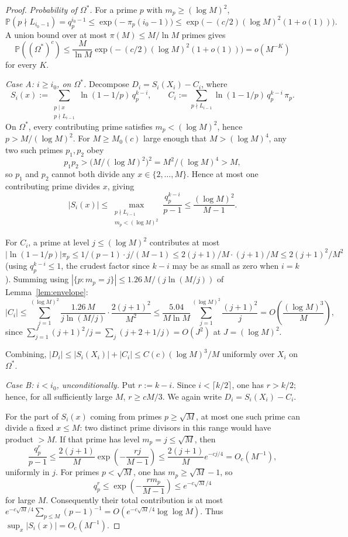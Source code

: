 \documentclass[11pt]{article}
\theoremstyle{remark}
\newcommand{\PP}{\mathbb{P}}
\begin{document}
\begin{proof}
\textit{Probability of $\Omega^*$.} For a prime $p$ with $m_p \geq (\log M)^2$,
\[
\PP(p \nmid L_{i_0-1}) = q_p^{i_0-1} \leq \exp\bigl(-\pi_p(i_0-1)\bigr) \leq \exp\bigl(-(c/2)(\log M)^2(1+o(1))\bigr).
\]
A union bound over at most $\pi(M) \leq M/\ln M$ primes gives
\[
\PP((\Omega^*)^c) \leq \frac{M}{\ln M}\exp\bigl(-(c/2)(\log M)^2(1+o(1))\bigr)=o(M^{-K})
\]
for every $K$.

\textit{Case A: $i \geq i_0$, on $\Omega^*$.}
Decompose $D_i = S_i(X_i) - C_i$, where
\[
S_i(x) := \sum_{\substack{p \mid x \\ p \nmid L_{i-1}}} \ln(1 - 1/p)\, q_p^{k-i}, \qquad C_i := \sum_{p \nmid L_{i-1}} \ln(1 - 1/p)\, q_p^{k-i}\, \pi_p.
\]
On $\Omega^*$, every contributing prime satisfies $m_p < (\log M)^2$, hence $p > M/(\log M)^2$. For $M \geq M_0(c)$ large enough that $M > (\log M)^4$, any two such primes $p_1, p_2$ obey
\[
p_1 p_2 > \bigl(M/(\log M)^2\bigr)^2 = M^2/(\log M)^4 > M,
\]
so $p_1$ and $p_2$ cannot both divide any $x \in \{2, \ldots, M\}$. Hence at most one contributing prime divides $x$, giving
\[
|S_i(x)| \leq \max_{\substack{p \nmid L_{i-1} \\ m_p < (\log M)^2}} \frac{q_p^{k-i}}{p-1} \leq \frac{(\log M)^2}{M-1}.
\]

For $C_i$, a prime at level $j \leq (\log M)^2$ contributes at most $|\ln(1-1/p)| \pi_p \leq 1/(p-1) \cdot j/(M-1) \leq 2(j+1)/M \cdot (j+1)/M \leq 2(j+1)^2/M^2$ (using $q_p^{k-i} \leq 1$, the crudest factor since $k-i$ may be as small as zero when $i = k$). Summing using $|\{p : m_p = j\}| \leq 1.26\, M/(j \ln(M/j))$ of Lemma~\ref{lem:envelope}:
\[
|C_i| \leq \sum_{j=1}^{(\log M)^2} \frac{1.26\, M}{j \ln(M/j)} \cdot \frac{2(j+1)^2}{M^2} \leq \frac{5.04}{M \ln M} \sum_{j=1}^{(\log M)^2} \frac{(j+1)^2}{j} = O\!\left(\frac{(\log M)^3}{M}\right),
\]
since $\sum_{j=1}^{J}(j+1)^2/j = \sum_j (j + 2 + 1/j) = O(J^2)$ at $J = (\log M)^2$.

Combining, $|D_i| \leq |S_i(X_i)|+|C_i| \leq C(c)(\log M)^3/M$ uniformly over $X_i$ on $\Omega^*$.

\textit{Case B: $i < i_0$, unconditionally.}
Put $r:=k-i$. Since $i<\lceil k/2\rceil$, one has $r>k/2$; hence, for all sufficiently large $M$, $r\geq cM/3$. We again write $D_i=S_i(X_i)-C_i$.

For the part of $S_i(x)$ coming from primes $p\geq\sqrt M$, at most one such prime can divide a fixed $x\leq M$: two distinct prime divisors in this range would have product $>M$. If that prime has level $m_p=j\leq\sqrt M$, then
\[
\frac{q_p^r}{p-1}
\leq \frac{2(j+1)}{M}
\exp\!\left(-\frac{rj}{M-1}\right)
\leq \frac{2(j+1)}{M}e^{-cj/4}
=O_c(M^{-1}),
\]
uniformly in $j$. For primes $p<\sqrt M$, one has $m_p\geq\sqrt M-1$, so
\[
q_p^r\leq \exp\!\left(-\frac{r m_p}{M-1}\right)
\leq e^{-c\sqrt M/4}
\]
for large $M$. Consequently their total contribution is at most
$e^{-c\sqrt M/4}\sum_{p\leq M}(p-1)^{-1}=O(e^{-c\sqrt M/4}\log\log M)$.
Thus $\sup_x|S_i(x)|=O_c(M^{-1})$.


\end{proof}
\end{document}
